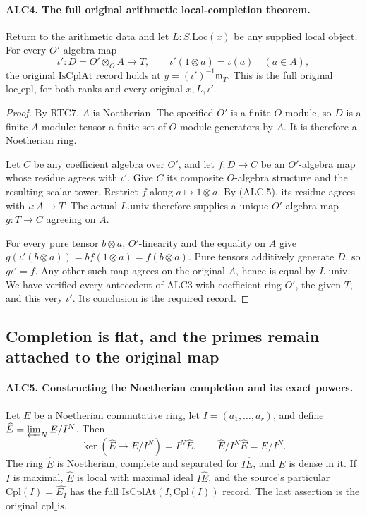 \paragraph{ALC4. The full original arithmetic local-completion theorem.}
\label{claim:ALC4}
Return to the arithmetic data and let \(L:S.\mathrm{Loc}(x)\)
be any supplied local object.  For every \(O'\)-algebra map
\[
 \iota':D=O'\otimes_OA\longrightarrow T,
 \qquad \iota'(1\otimes a)=\iota(a)\quad(a\in A),
                                                        \tag{ALC.5}
\]
the original \(\mathrm{IsCplAt}\) record holds at
\(y=(\iota')^{-1}\mathfrak m_T\).  This is the full
original \(\mathrm{loc\_cpl}\), for both ranks and every
original \(x,L,\iota'\).

\begin{proof}
By RTC7, \(A\) is Noetherian.  The specified \(O'\) is a
finite \(O\)-module, so \(D\) is a finite \(A\)-module:
tensor a finite set of \(O\)-module generators by \(A\).
It is therefore a Noetherian ring.

Let \(C\) be any coefficient algebra over \(O'\), and let
\(f:D\to C\) be an \(O'\)-algebra map whose residue agrees
with \(\iota'\).  Give \(C\) its composite \(O\)-algebra
structure and the resulting scalar tower.  Restrict \(f\)
along \(a\mapsto1\otimes a\).  By (ALC.5), its residue
agrees with \(\iota:A\to T\).  The actual \(L.\mathrm{univ}\)
therefore supplies a unique \(O'\)-algebra map \(g:T\to C\)
agreeing on \(A\).

For every pure tensor \(b\otimes a\), \(O'\)-linearity
and the equality on \(A\) give
\(g(\iota'(b\otimes a))=b f(1\otimes a)=f(b\otimes a)\).
Pure tensors additively generate \(D\), so \(g\iota'=f\).
Any other such map agrees on the original \(A\), hence is
equal by \(L.\mathrm{univ}\).  We have verified every
antecedent of ALC3 with coefficient ring \(O'\), the given
\(T\), and this very \(\iota'\).  Its conclusion is the
required record.
\end{proof}

\subsection{Completion is flat, and the primes remain attached to the original map}

\paragraph{ALC5. Constructing the Noetherian completion and its exact powers.}
\label{claim:ALC5}
Let \(E\) be a Noetherian commutative ring, let
\(I=(a_1,\ldots,a_r)\), and define
\(\widehat E=\varprojlim_N E/I^N\).  Then
\[
 \ker(\widehat E\to E/I^N)=I^N\widehat E,
 \qquad \widehat E/I^N\widehat E=E/I^N.          \tag{ALC.6}
\]
The ring \(\widehat E\) is Noetherian, complete and separated
for \(I\widehat E\), and \(E\) is dense in it.  If \(I\)
is maximal, \(\widehat E\) is local with maximal ideal
\(I\widehat E\), and the source's particular
\(\mathrm{Cpl}(I)=\widehat{E_I}\) has the full
\(\mathrm{IsCplAt}(I,\mathrm{Cpl}(I))\) record.  The last
assertion is the original \(\mathrm{cpl\_is}\).

